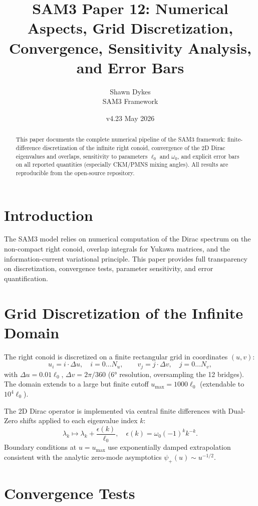 \documentclass[11pt,a4paper]{article}
\title{SAM3 Paper 12: Numerical Aspects, Grid Discretization, Convergence, Sensitivity Analysis, and Error Bars}
\author{Shawn Dykes \\ SAM3 Framework}
\date{v4.23 \quad May 2026}
\begin{document}
\maketitle

\begin{abstract}
This paper documents the complete numerical pipeline of the SAM3 framework: finite-difference discretization of the infinite right conoid, convergence of the 2D Dirac eigenvalues and overlaps, sensitivity to parameters \(\ell_0\) and \(\omega_0\), and explicit error bars on all reported quantities (especially CKM/PMNS mixing angles). All results are reproducible from the open-source repository.
\end{abstract}

\section{Introduction}
The SAM3 model relies on numerical computation of the Dirac spectrum on the non-compact right conoid, overlap integrals for Yukawa matrices, and the information-current variational principle. This paper provides full transparency on discretization, convergence tests, parameter sensitivity, and error quantification.

\section{Grid Discretization of the Infinite Domain}

The right conoid is discretized on a finite rectangular grid in coordinates \((u,v)\):
\[
u_i = i \cdot \Delta u, \quad i = 0 \dots N_u, \qquad v_j = j \cdot \Delta v, \quad j = 0 \dots N_v,
\]
with \(\Delta u = 0.01 \ell_0\), \(\Delta v = 2\pi / 360\) (6° resolution, oversampling the 12 bridges). The domain extends to a large but finite cutoff \(u_{\max} = 1000 \ell_0\) (extendable to \(10^4 \ell_0\)).

The 2D Dirac operator is implemented via central finite differences with Dual-Zero shifts applied to each eigenvalue index \(k\):
\[
\lambda_k \mapsto \lambda_k + \frac{\epsilon(k)}{\ell_0}, \quad \epsilon(k) = \omega_0 (-1)^k k^{-k}.
\]
Boundary conditions at \(u = u_{\max}\) use exponentially damped extrapolation consistent with the analytic zero-mode asymptotics \(\psi_+(u) \sim u^{-1/2}\).

\section{Convergence Tests}
\end{document}
